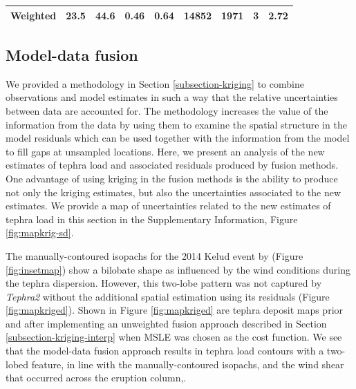 \documentclass[a4paper,fleqn]{cas-sc}
\begin{document}
\begin{table}[]
\begin{tabular}{crrrrrrrr}
Weighted                                                                                                   & 23.5                                                                                   & 44.6                                                                                        & 0.46                                                                            & 0.64                                                                                          & 14852                                                                                     & 1971                                                                                               & \textbf{3}                                                                              & 2.72                                                                                   \\ \hline
\end{tabular}
\end{table}

\subsection{Model-data fusion}\label{subsection-res-fusion}

We provided a methodology in Section \ref{subsection-kriging} to combine observations and model estimates in such a way that the relative uncertainties between data are accounted for. The methodology increases the value of the information from the data by using them to examine the spatial structure in the model residuals which can be used together with the information from the model to fill gaps at unsampled locations. Here, we present an analysis of the new estimates of tephra load and associated residuals produced by fusion methods. One advantage of using kriging in the fusion methods is the ability to produce not only the kriging estimates, but also the uncertainties associated to the new estimates. We provide a map of uncertainties related to the new estimates of tephra load in this section in the Supplementary Information, Figure \ref{fig:mapkrig-sd}.

The manually-contoured isopachs for the 2014 Kelud event by \cite{MAENO201924} (Figure \ref{fig:insetmap}) show a bilobate shape as influenced by the wind conditions during the tephra dispersion. However, this two-lobe pattern was not captured by \textit{Tephra2} without the additional spatial estimation using its residuals (Figure \ref{fig:mapkriged}). Shown in Figure \ref{fig:mapkriged} are tephra deposit maps prior and after implementing an unweighted fusion approach described in Section \ref{subsection-kriging-interp} when MSLE was chosen as the cost function. We see that the model-data fusion approach results in tephra load contours with a two-lobed feature, in line with the manually-contoured isopachs, and the wind shear that occurred across the eruption column,.
\end{document}
